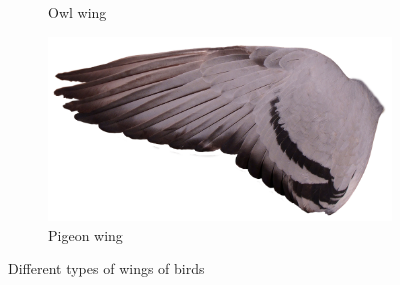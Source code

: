 \documentclass[conference]{IEEEtran}
\begin{document}
\begin{figure}
\begin{subfigure}{0.48\textwidth}
					\caption{Owl wing}
				\end{subfigure}
				\hfill
				\begin{subfigure}{0.48\textwidth}   
					\centering 
					\includegraphics[width=\textwidth]{imgs/pigeon_wing.png}
					\caption{Pigeon wing}
				\end{subfigure}
				\caption{Different types of wings of birds}
				\label{fig:10}
			\end{figure}
\end{document}
